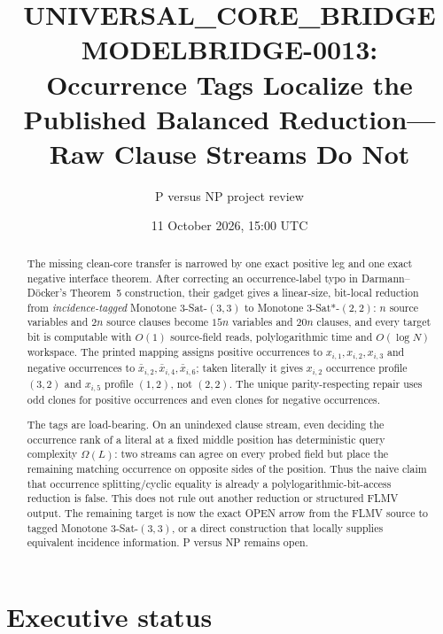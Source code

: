 \documentclass[11pt]{article}
\title{UNIVERSAL\_CORE\_BRIDGE MODELBRIDGE-0013:\\
Occurrence Tags Localize the Published Balanced Reduction---Raw Clause Streams Do Not}
\author{P versus NP project review}
\date{11 October 2026, 15:00 UTC}
\begin{document}
\maketitle

\begin{abstract}
The missing clean-core transfer is narrowed by one exact positive leg and one
exact negative interface theorem.  After correcting an occurrence-label typo
in Darmann--D\"ocker's Theorem~5 construction, their gadget gives a
linear-size, bit-local reduction from \emph{incidence-tagged} Monotone
3-Sat-$(3,3)$ to Monotone 3-Sat*-${}(2,2)$: $n$ source variables and $2n$
source clauses become $15n$ variables and $20n$ clauses, and every target bit
is computable with $O(1)$ source-field reads, polylogarithmic time and
$O(\log N)$ workspace.  The printed mapping assigns positive occurrences to
$x_{i,1},x_{i,2},x_{i,3}$ and negative occurrences to
$\bar x_{i,2},\bar x_{i,4},\bar x_{i,6}$; taken literally it gives
$x_{i,2}$ occurrence profile $(3,2)$ and $x_{i,5}$ profile $(1,2)$, not
$(2,2)$.  The unique parity-respecting repair uses odd clones for positive
occurrences and even clones for negative occurrences.

The tags are load-bearing.  On an unindexed clause stream, even deciding the
occurrence rank of a literal at a fixed middle position has deterministic
query complexity $\Omega(L)$: two streams can agree on every probed field but
place the remaining matching occurrence on opposite sides of the position.
Thus the naive claim that occurrence splitting/cyclic equality is already a
polylogarithmic-bit-access reduction is false.  This does not rule out another
reduction or structured FLMV output.  The remaining target is now the exact
OPEN arrow from the FLMV source to tagged Monotone 3-Sat-$(3,3)$, or a direct
construction that locally supplies equivalent incidence information.  P
versus NP remains open.
\end{abstract}

\section{Executive status}
\end{document}
